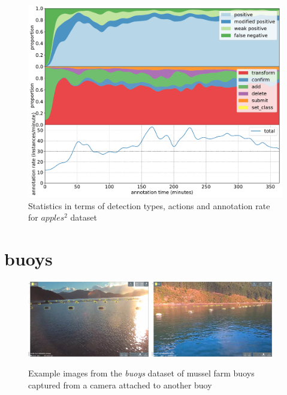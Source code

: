 \begin{figure}[!h]
\centering
\includegraphics[width=1.0\linewidth]{charts/action_annotations/apples2.pdf}
\caption{Statistics in terms of detection types, actions and annotation rate for $apples^2$ dataset}
\label{fig:apples2_annotation}
\end{figure}

\pagebreak
\section{buoys}
\label{sec:buoys_details}


\begin{figure}[H]
  \includegraphics[width=0.475\textwidth]{figures/annotation/screenshots/buoys.png}
  \hfill
  \includegraphics[width=0.475\textwidth]{figures/annotation/screenshots/buoys2.png}
  \caption{Example images from the \emph{buoys} dataset of mussel farm buoys captured from a camera attached to another buoy }
  \label{fig:buoys_dataset}
\end{figure}


